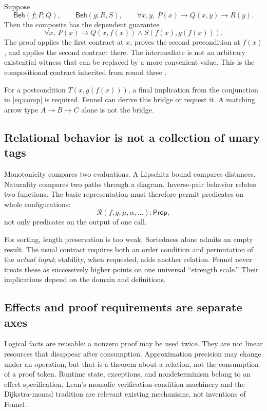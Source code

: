 \documentclass[11pt,a4paper]{article}
\theoremstyle{definition}
\theoremstyle{remark}
\newcommand{\Prop}{\mathsf{Prop}}
\newcommand{\Beh}{\mathsf{Beh}}
\begin{document}
Suppose
\[
 \Beh(f;P,Q),\qquad \Beh(g;R,S),\qquad
 \forall x,y,\ P(x)\to Q(x,y)\to R(y).
\]
Then the composite has the dependent guarantee
\begin{equation}\label{eq:comp}
 \forall x,\ P(x)\to
 Q(x,f(x))\land S(f(x),g(f(x))).
\end{equation}
The proof applies the first contract at $x$, proves the second precondition
at $f(x)$, and applies the second contract there. The intermediate is not an
arbitrary existential witness that can be replaced by a more convenient value.
This is the compositional contract inherited from round three
\cite{synA,synB}.

For a postcondition $T(x,g(f(x)))$, a final implication from the conjunction in
\eqref{eq:comp} is required. Fennel can derive this bridge or request it. A
matching arrow type $A\to B\to C$ alone is not the bridge.

\subsection{Relational behavior is not a collection of unary tags}
Monotonicity compares two evaluations. A Lipschitz bound compares distances.
Naturality compares two paths through a diagram. Inverse-pair behavior relates
two functions. The basic representation must therefore permit predicates on
whole configurations:
\[
 \mathcal R(f,g,\mu,\alpha,\ldots):\Prop,
\]
not only predicates on the output of one call.

For sorting, length preservation is too weak. Sortedness alone admits an empty
result. The usual contract requires both an order condition and permutation of
the \emph{actual input}; stability, when requested, adds another relation.
Fennel never treats these as successively higher points on one universal
``strength scale.'' Their implications depend on the domain and definitions.

\subsection{Effects and proof requirements are separate axes}
Logical facts are reusable: a nonzero proof may be used twice. They are not
linear resources that disappear after consumption. Approximation precision may
change under an operation, but that is a theorem about a relation, not the
consumption of a proof token. Runtime state, exceptions, and nondeterminism
belong to an effect specification. Lean's monadic verification-condition
machinery and the Dijkstra-monad tradition are relevant existing mechanisms,
not inventions of Fennel \cite{mvcgen,dm}.
\end{document}
